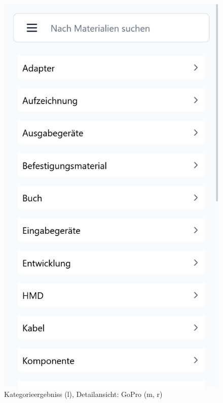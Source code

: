 \begin{figure}[p]
    \includegraphics[scale=0.17]{Bilder/Dialgobeispiel/Kategorien.png}
    \caption[Dialogbeispiel 1]{Kategorieergebniss (l), Detailansicht: GoPro (m, r)}\label{fig:login}
\end{figure}
